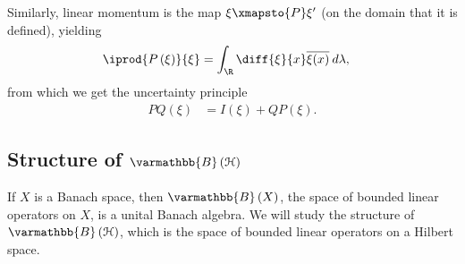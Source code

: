 \documentclass[10pt]{mypackage}
\renewcommand*{\mathbb}[1]{\varmathbb{#1}}
\newcommand{\B}{\mathbb{B}}
\begin{document}
Similarly, linear momentum is the map $\xi\xmapsto{P} \xi'$ (on the domain that it is defined), yielding
\begin{align*}
  \iprod{P\left(\xi\right)}{\xi} &= \int_{\R}^{} \diff{\xi}{x}\overline{\xi(x)}\:d\lambda,
\end{align*}
from which we get the uncertainty principle
\begin{align*}
  PQ\left(\xi\right) &= I\left(\xi\right) + QP\left(\xi\right).
\end{align*}
\subsection{Structure of $\B\left(\mathcal{H}\right)$}%
If $X$ is a Banach space, then $\B\left(X\right)$, the space of bounded linear operators on $X$, is a unital Banach algebra. We will study the structure of $\B\left(\mathcal{H}\right)$, which is the space of bounded linear operators on a Hilbert space.
\end{document}
